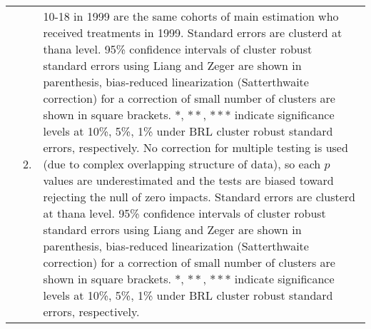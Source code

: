 \begin{table}
\begin{tabular}{>{\hfill\scriptsize}p{1cm}<{}>{\hfill\scriptsize}p{.5cm}<{}>{\scriptsize}p{12cm}<{\hfill}}
& 2. & \textsf{10-18 in 1999} are the same cohorts of main estimation who received treatments in 1999. Standard errors are clusterd at thana level. 95\% confidence intervals of cluster robust standard errors using Liang and Zeger are shown in parenthesis, bias-reduced linearization (Satterthwaite correction) for a correction of small number of clusters are shown in square brackets. $*$, $**$, $***$ indicate significance levels at 10\%, 5\%, 1\% under BRL cluster robust standard errors, respectively. No correction for multiple testing is used (due to complex overlapping structure of data), so each $p$ values are underestimated and the tests are biased toward rejecting the null of zero impacts. Standard errors are clusterd at thana level. 95\% confidence intervals of cluster robust standard errors using Liang and Zeger are shown in parenthesis, bias-reduced linearization (Satterthwaite correction) for a correction of small number of clusters are shown in square brackets. $*$, $**$, $***$ indicate significance levels at 10\%, 5\%, 1\% under BRL cluster robust standard errors, respectively.\end{tabular}
\end{table}



